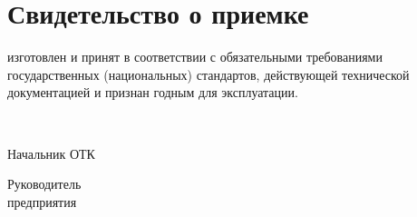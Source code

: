 \newpage

\section{Свидетельство о приемке}

\noindent%
\nameksaunumber
\bigskip
  \noindent изготовлен и принят в соответствии с обязательными требованиями 
  государственных (национальных) стандартов, действующей технической 
  документацией и признан годным для эксплуатации.\par
\bigskip

\begin{centering} 
  \ \par Начальник ОТК \par
\end{centering}
\bigskip
\MPscript
\vfill
\noindent \parbox{0.3\textwidth}{Руководитель\\ предприятия}
\hfill {}

\bigskip
\MPscript
